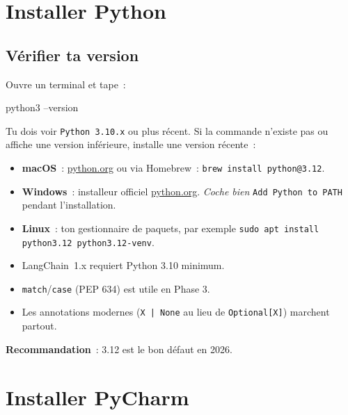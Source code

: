 \documentclass[11pt,a4paper]{article}
\begin{document}
\section{Installer Python}

\subsection{Vérifier ta version}

Ouvre un terminal et tape~:

\begin{bashcode}
python3 --version
\end{bashcode}

Tu dois voir \texttt{Python 3.10.x} ou plus récent. Si la commande
n'existe pas ou affiche une version inférieure, installe une version
récente~:

\begin{itemize}[leftmargin=*]
  \item \textbf{macOS}~: \href{https://www.python.org/downloads/}{python.org}
        ou via Homebrew~: \texttt{brew install python@3.12}.
  \item \textbf{Windows}~: installeur officiel
        \href{https://www.python.org/downloads/}{python.org}.
        \emph{Coche bien} \texttt{Add Python to PATH} pendant
        l'installation.
  \item \textbf{Linux}~: ton gestionnaire de paquets, par exemple
        \texttt{sudo apt install python3.12 python3.12-venv}.
\end{itemize}

\begin{tcolorbox}[title=Pourquoi 3.10+~?]
\begin{itemize}[leftmargin=*]
  \item LangChain~1.x requiert Python 3.10 minimum.
  \item \texttt{match}/\texttt{case} (PEP 634) est utile en Phase 3.
  \item Les annotations modernes (\texttt{X | None} au lieu de
        \texttt{Optional[X]}) marchent partout.
\end{itemize}
\textbf{Recommandation}~: 3.12 est le bon défaut en 2026.
\end{tcolorbox}

\section{Installer PyCharm}
\end{document}
